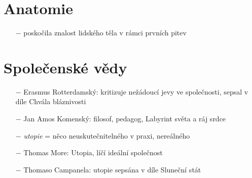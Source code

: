 \documentclass{article}
\begin{document}
\section*{Anatomie}
\begin{itemize}
    \vspace{-0.5em}
    \setlength\itemsep{0.15em}
    \item[$-$] poskočila znalost lidského těla v rámci prvních pitev
\end{itemize}

\section*{Společenské vědy}
\begin{itemize}
    \vspace{-0.5em}
    \setlength\itemsep{0.15em}
    \item[$-$] Erasmus Rotterdamský: kritizuje nežádoucí jevy ve společnosti, sepsal v díle Chvála bláznivosti
    \item[$-$] Jan Amos Komenský: filosof, pedagog, Labyrint světa a ráj srdce
    \item[$-$] \textit{utopie} = něco neuskutečnitelného v praxi, nereálného
    \item[$-$] Thomas More: Utopia, líčí ideální společnost
    \item[$-$] Thomaso Campanela: utopie sepsána v díle Sluneční stát 
\end{itemize}
\end{document}
